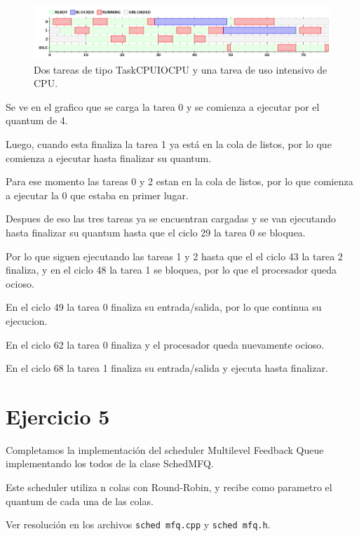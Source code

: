 \begin{figure}[h!]
  \caption{Dos tareas de tipo TaskCPUIOCPU y una tarea de uso intensivo de CPU.}
  \centering
    \includegraphics[width=1\textwidth]{img/ejercicio4_2.png}
\end{figure}

Se ve en el grafico que se carga la tarea 0 y se comienza a ejecutar por el quantum de 4.

Luego, cuando esta finaliza la tarea 1 ya est\'a en la cola de listos, por lo que comienza a ejecutar hasta finalizar su quantum.

Para ese momento las tareas 0 y 2 estan en la cola de listos, por lo que comienza a ejecutar la 0 que estaba en primer lugar.

Despues de eso las tres tareas ya se encuentran cargadas y se van ejecutando hasta finalizar su quantum hasta que el ciclo 29 la tarea 0 se bloquea.

Por lo que siguen ejecutando las tareas 1 y 2 hasta que el el ciclo 43 la tarea 2 finaliza, y en el ciclo 48 la tarea 1 se bloquea, por lo que el procesador queda ocioso.

En el ciclo 49 la tarea 0 finaliza su entrada/salida, por lo que continua su ejecucion. 

En el ciclo 62 la tarea 0 finaliza y el procesador queda nuevamente ocioso.

En el ciclo 68 la tarea 1 finaliza su entrada/salida y ejecuta hasta finalizar.


\section{Ejercicio 5}

Completamos la implementaci\'on del scheduler Multilevel Feedback Queue implementando los todos de la clase SchedMFQ.

Este scheduler utiliza n colas con Round-Robin, y recibe como parametro el quantum de cada una de las colas.

Ver resoluci\'on en los archivos \verb|sched mfq.cpp| y \verb|sched mfq.h|.
